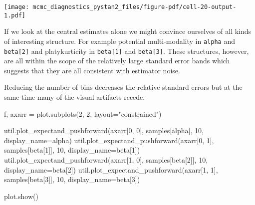 \documentclass[
  letterpaper,
  DIV=11,
  numbers=noendperiod]{scrartcl}
\newenvironment{Shaded}{\begin{snugshade}}{\end{snugshade}}
\newcommand{\DecValTok}[1]{\textcolor[rgb]{0.68,0.00,0.00}{#1}}
\newcommand{\NormalTok}[1]{\textcolor[rgb]{0.00,0.23,0.31}{#1}}
\newcommand{\OperatorTok}[1]{\textcolor[rgb]{0.37,0.37,0.37}{#1}}
\newcommand{\StringTok}[1]{\textcolor[rgb]{0.13,0.47,0.30}{#1}}
\begin{document}
\texttt{[image: mcmc\_diagnostics\_pystan2\_files/figure-pdf/cell-20-output-1.pdf]}

If we look at the central estimates alone we might convince ourselves of
all kinds of interesting structure. For example potential multi-modality
in \texttt{alpha} and \texttt{beta{[}2{]}} and platykurticity in
\texttt{beta{[}1{]}} and \texttt{beta{[}3{]}}. These structures,
however, are all within the scope of the relatively large standard error
bands which suggests that they are all consistent with estimator noise.

Reducing the number of bins decreases the relative standard errors but
at the same time many of the visual artifacts recede.

\begin{Shaded}
\begin{Highlighting}[]
\NormalTok{f, axarr }\OperatorTok{=}\NormalTok{ plot.subplots(}\DecValTok{2}\NormalTok{, }\DecValTok{2}\NormalTok{, layout}\OperatorTok{=}\StringTok{"constrained"}\NormalTok{)}

\NormalTok{util.plot\_expectand\_pushforward(axarr[}\DecValTok{0}\NormalTok{, }\DecValTok{0}\NormalTok{], samples[}\StringTok{\textquotesingle{}alpha\textquotesingle{}}\NormalTok{], }
                                \DecValTok{10}\NormalTok{, display\_name}\OperatorTok{=}\StringTok{\textquotesingle{}alpha\textquotesingle{}}\NormalTok{)}
\NormalTok{util.plot\_expectand\_pushforward(axarr[}\DecValTok{0}\NormalTok{, }\DecValTok{1}\NormalTok{], samples[}\StringTok{\textquotesingle{}beta[1]\textquotesingle{}}\NormalTok{], }
                                \DecValTok{10}\NormalTok{, display\_name}\OperatorTok{=}\StringTok{\textquotesingle{}beta[1]\textquotesingle{}}\NormalTok{)}
\NormalTok{util.plot\_expectand\_pushforward(axarr[}\DecValTok{1}\NormalTok{, }\DecValTok{0}\NormalTok{], samples[}\StringTok{\textquotesingle{}beta[2]\textquotesingle{}}\NormalTok{], }
                                \DecValTok{10}\NormalTok{, display\_name}\OperatorTok{=}\StringTok{\textquotesingle{}beta[2]\textquotesingle{}}\NormalTok{)}
\NormalTok{util.plot\_expectand\_pushforward(axarr[}\DecValTok{1}\NormalTok{, }\DecValTok{1}\NormalTok{], samples[}\StringTok{\textquotesingle{}beta[3]\textquotesingle{}}\NormalTok{], }
                                \DecValTok{10}\NormalTok{, display\_name}\OperatorTok{=}\StringTok{\textquotesingle{}beta[3]\textquotesingle{}}\NormalTok{)}

\NormalTok{plot.show()}
\end{Highlighting}
\end{Shaded}
\end{document}

